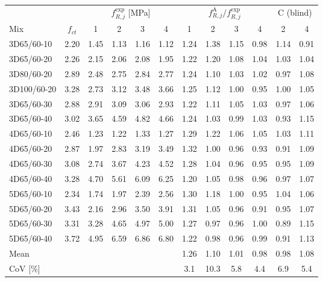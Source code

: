 \begin{tabular}{l c cccc cccc cc}
\toprule
 & & \multicolumn{4}{c}{$f_{R,j}^{\mathrm{exp}}$ [MPa]} & \multicolumn{4}{c}{$f_{R,j}^{\mathrm{A}}/f_{R,j}^{\mathrm{exp}}$} & \multicolumn{2}{c}{C (blind)}\\
\cmidrule(lr){3-6}\cmidrule(lr){7-10}\cmidrule(lr){11-12}
Mix & $f_{ct}$ & 1 & 2 & 3 & 4 & 1 & 2 & 3 & 4 & 2 & 4\\
\midrule
3D65/60-10 & 2.20 & 1.45 & 1.13 & 1.16 & 1.12 & 1.24 & 1.38 & 1.15 & 0.98 & 1.14 & 0.91\\
3D65/60-20 & 2.26 & 2.15 & 2.06 & 2.08 & 1.95 & 1.22 & 1.20 & 1.08 & 1.04 & 1.03 & 1.04\\
3D80/60-20 & 2.89 & 2.48 & 2.75 & 2.84 & 2.77 & 1.24 & 1.10 & 1.03 & 1.02 & 0.97 & 1.08\\
3D100/60-20 & 3.28 & 2.73 & 3.12 & 3.48 & 3.66 & 1.25 & 1.12 & 1.00 & 0.95 & 1.00 & 1.05\\
3D65/60-30 & 2.88 & 2.91 & 3.09 & 3.06 & 2.93 & 1.22 & 1.11 & 1.05 & 1.03 & 0.97 & 1.06\\
3D65/60-40 & 3.02 & 3.65 & 4.59 & 4.82 & 4.66 & 1.24 & 1.03 & 0.99 & 1.03 & 0.93 & 1.15\\
4D65/60-10 & 2.46 & 1.23 & 1.22 & 1.33 & 1.27 & 1.29 & 1.22 & 1.06 & 1.05 & 1.03 & 1.11\\
4D65/60-20 & 2.87 & 1.97 & 2.83 & 3.19 & 3.49 & 1.32 & 1.00 & 0.96 & 0.93 & 0.91 & 1.09\\
4D65/60-30 & 3.08 & 2.74 & 3.67 & 4.23 & 4.52 & 1.28 & 1.04 & 0.96 & 0.95 & 0.95 & 1.09\\
4D65/60-40 & 3.28 & 4.70 & 5.61 & 6.09 & 6.25 & 1.20 & 1.05 & 0.98 & 0.96 & 0.97 & 1.07\\
5D65/60-10 & 2.34 & 1.74 & 1.97 & 2.39 & 2.56 & 1.30 & 1.18 & 1.00 & 0.95 & 1.04 & 1.06\\
5D65/60-20 & 3.43 & 2.16 & 2.96 & 3.50 & 3.91 & 1.31 & 1.05 & 0.96 & 0.91 & 0.95 & 1.07\\
5D65/60-30 & 3.31 & 3.28 & 4.65 & 4.97 & 5.00 & 1.27 & 0.97 & 0.96 & 1.00 & 0.89 & 1.15\\
5D65/60-40 & 3.72 & 4.95 & 6.59 & 6.86 & 6.80 & 1.22 & 0.98 & 0.96 & 0.99 & 0.91 & 1.13\\
\midrule
Mean & & & & & & 1.26 & 1.10 & 1.01 & 0.98 & 0.98 & 1.08\\
CoV [\%] & & & & & & 3.1 & 10.3 & 5.8 & 4.4 & 6.9 & 5.4\\
\bottomrule
\end{tabular}

